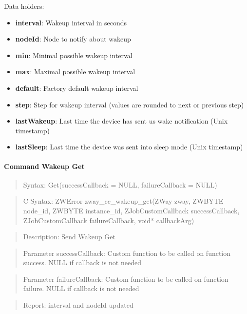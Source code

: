 \noindent
Data holders:

\begin{itemize}
\item \textbf{interval}: Wakeup interval in seconds
\item \textbf{nodeId}: Node to notify about wakeup
\item \textbf{min}: Minimal possible wakeup interval
\item \textbf{max}: Maximal possible wakeup interval
\item \textbf{default}: Factory default wakeup interval
\item \textbf{step}: Step for wakeup interval (values are rounded to next or previous step)
\item \textbf{lastWakeup}: Last time the device has sent us wake notification (Unix timestamp)
\item \textbf{lastSleep}: Last time the device was sent into sleep mode (Unix timestamp)
\end{itemize}

\paragraph{Command Wakeup Get}
\begin{quote}Syntax: Get(successCallback = NULL, failureCallback = NULL)\end{quote}
\begin{quote}C Syntax: ZWError zway\_cc\_wakeup\_get(ZWay zway, ZWBYTE node\_id, ZWBYTE instance\_id, ZJobCustomCallback successCallback, ZJobCustomCallback failureCallback, void* callbackArg)\end{quote}
\begin{quote}Description: Send Wakeup Get\end{quote}
\begin{quote}Parameter successCallback: Custom function to be called on function success. NULL if callback is not needed\end{quote}
\begin{quote}Parameter failureCallback: Custom function to be called on function failure. NULL if callback is not needed\end{quote}
\begin{quote}Report: interval and nodeId updated\end{quote}


